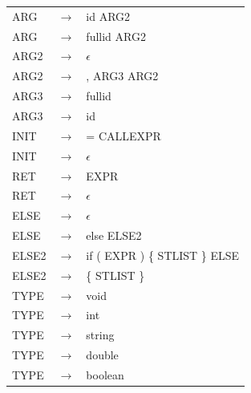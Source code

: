 \documentclass[11pt,a4paper]{article}
\begin{document}
\begin{tabular}{l c l}
		ARG &$\rightarrow$& id ARG2 \\
		ARG &$\rightarrow$& fullid ARG2 \\
		ARG2 &$\rightarrow$& $\epsilon$ \\
		ARG2 &$\rightarrow$& , ARG3 ARG2 \\
		ARG3 &$\rightarrow$& fullid \\
		ARG3 &$\rightarrow$& id \\
		INIT &$\rightarrow$& = CALLEXPR \\
		INIT &$\rightarrow$& $\epsilon$ \\
		RET &$\rightarrow$& EXPR \\
		RET &$\rightarrow$& $\epsilon$ \\
		ELSE &$\rightarrow$& $\epsilon$ \\
		ELSE &$\rightarrow$& else ELSE2 \\
		ELSE2 &$\rightarrow$& if ( EXPR ) \{ STLIST \} ELSE \\
		ELSE2 &$\rightarrow$& \{ STLIST \} \\
		TYPE &$\rightarrow$& void \\
		TYPE &$\rightarrow$& int \\
		TYPE &$\rightarrow$& string \\
		TYPE &$\rightarrow$& double \\
		TYPE &$\rightarrow$& boolean \\
	\end{tabular}


	\newpage
\end{document}

